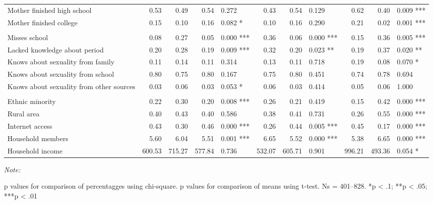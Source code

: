 \documentclass[
]{article}
\begin{document}
\begin{landscape}
\begin{table}[!h]
{\begin{threeparttable}
\begin{tabular}[t]{lrrrlrrlrrl}
\hspace{1em}Mother finished high school & 0.53 & 0.49 & 0.54 & 0.272 & 0.43 & 0.54 & 0.129 & 0.62 & 0.40 & 0.009 ***\\
\hspace{1em}Mother finished college & 0.15 & 0.10 & 0.16 & 0.082  * & 0.10 & 0.16 & 0.290 & 0.21 & 0.02 & 0.001 ***\\
\addlinespace[2em]
\multicolumn{11}{l}{\textit{Daughter-related variables}}\\
\hspace{1em}Misses school & 0.08 & 0.27 & 0.05 & 0.000 *** & 0.36 & 0.06 & 0.000 *** & 0.15 & 0.36 & 0.005 ***\\
\hspace{1em}Lacked knowledge about period & 0.20 & 0.28 & 0.19 & 0.009 *** & 0.32 & 0.20 & 0.023 ** & 0.19 & 0.37 & 0.020 **\\
\hspace{1em}Knows about sexuality from family & 0.11 & 0.14 & 0.11 & 0.314 & 0.13 & 0.11 & 0.718 & 0.19 & 0.08 & 0.070  *\\
\hspace{1em}Knows about sexuality from school & 0.80 & 0.75 & 0.80 & 0.167 & 0.75 & 0.80 & 0.451 & 0.74 & 0.78 & 0.694\\
\hspace{1em}Knows about sexuality from other sources & 0.03 & 0.06 & 0.03 & 0.053  * & 0.06 & 0.03 & 0.414 & 0.05 & 0.06 & 1.000\\
\addlinespace[2em]
\multicolumn{11}{l}{\textit{Household-related variables}}\\
\hspace{1em}Ethnic minority & 0.22 & 0.30 & 0.20 & 0.008 *** & 0.26 & 0.21 & 0.419 & 0.15 & 0.42 & 0.000 ***\\
\hspace{1em}Rural area & 0.40 & 0.43 & 0.40 & 0.586 & 0.38 & 0.41 & 0.731 & 0.26 & 0.55 & 0.000 ***\\
\hspace{1em}Internet access & 0.43 & 0.30 & 0.46 & 0.000 *** & 0.26 & 0.44 & 0.005 *** & 0.45 & 0.17 & 0.000 ***\\
\hspace{1em}Household members & 5.60 & 6.04 & 5.51 & 0.001 *** & 6.65 & 5.52 & 0.000 *** & 5.38 & 6.65 & 0.000 ***\\
\hspace{1em}Household income & 600.53 & 715.27 & 577.84 & 0.736 & 532.07 & 605.71 & 0.901 & 996.21 & 493.36 & 0.054  *\\
\bottomrule
\end{tabular}
\begin{tablenotes}[para]
\item \textit{Note: } 
\item p values for comparison of percentagges using chi-square. p values for comparison of means using t-test. Ns = 401–828. *p < .1; **p < .05; ***p < .01
\end{tablenotes}
\end{threeparttable}}
\end{table}
\end{landscape}
\newpage
\end{document}

